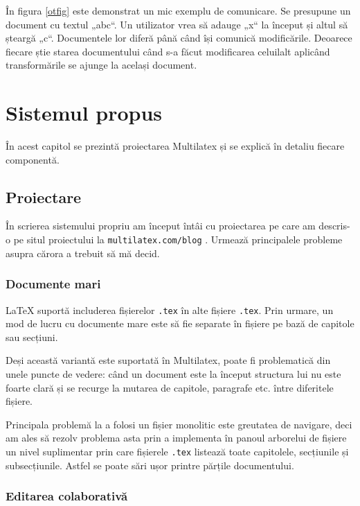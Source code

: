 \documentclass[a4wide,12pt]{report}
\newcommand{\cod}[1]{\texttt{#1}}
\begin{document}
În figura \ref{otfig} este demonstrat un mic exemplu de comunicare. Se presupune
un document cu textul „abc“. Un utilizator vrea să adauge „x“ la început și
altul să șteargă „c“. Documentele lor diferă până când își comunică modificările.
Deoarece fiecare știe starea documentului când s-a făcut modificarea celuilalt
aplicând transformările se ajunge la același document.

\chapter{Sistemul propus}

În acest capitol se prezintă proiectarea Multilatex și se explică în detaliu
fiecare componentă.

\section{Proiectare}

În scrierea sistemului propriu am început întâi cu proiectarea pe care am
descris-o pe situl proiectului la \cod{multilatex.com/blog} . Urmează
principalele probleme asupra cărora a trebuit să mă decid.

\subsection{Documente mari}
\label{documentemarisub}

\LaTeX{} suportă includerea fișierelor \cod{.tex} în alte fișiere \cod{.tex}.
Prin urmare, un mod de lucru cu documente mare este să fie separate în fișiere
pe bază de capitole sau secțiuni.

Deși această variantă este suportată în Multilatex, poate fi problematică din
unele puncte de vedere: când un document este la început structura lui nu este
foarte clară și se recurge la mutarea de capitole, paragrafe etc. între
diferitele fișiere.

Principala problemă la a folosi un fișier monolitic este greutatea de navigare,
deci am ales să rezolv problema asta prin a implementa în panoul arborelui de
fișiere un nivel suplimentar prin care fișierele \cod{.tex} listează toate
capitolele, secțiunile și subsecțiunile. Astfel se poate sări ușor printre
părțile documentului.

\subsection{Editarea colaborativă}
\end{document}
